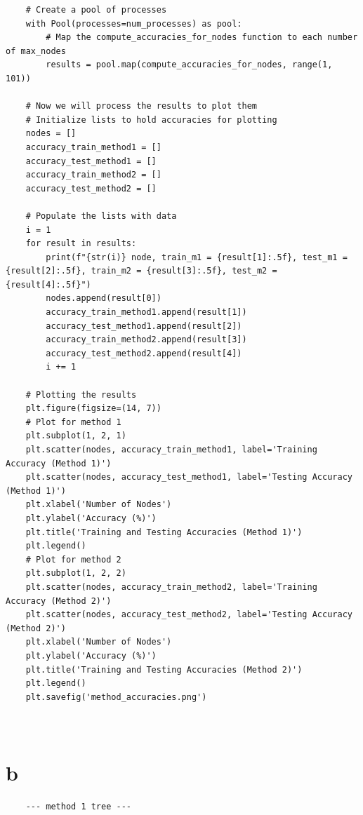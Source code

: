 \documentclass[10pt]{article}
\begin{document}
\begin{enumerate}
\begin{lstlisting}
    # Create a pool of processes
    with Pool(processes=num_processes) as pool:
        # Map the compute_accuracies_for_nodes function to each number of max_nodes
        results = pool.map(compute_accuracies_for_nodes, range(1, 101))

    # Now we will process the results to plot them
    # Initialize lists to hold accuracies for plotting
    nodes = []
    accuracy_train_method1 = []
    accuracy_test_method1 = []
    accuracy_train_method2 = []
    accuracy_test_method2 = []

    # Populate the lists with data
    i = 1
    for result in results:
        print(f"{str(i)} node, train_m1 = {result[1]:.5f}, test_m1 = {result[2]:.5f}, train_m2 = {result[3]:.5f}, test_m2 = {result[4]:.5f}")
        nodes.append(result[0])
        accuracy_train_method1.append(result[1])
        accuracy_test_method1.append(result[2])
        accuracy_train_method2.append(result[3])
        accuracy_test_method2.append(result[4])
        i += 1
    
    # Plotting the results
    plt.figure(figsize=(14, 7))
    # Plot for method 1
    plt.subplot(1, 2, 1)
    plt.scatter(nodes, accuracy_train_method1, label='Training Accuracy (Method 1)')
    plt.scatter(nodes, accuracy_test_method1, label='Testing Accuracy (Method 1)')
    plt.xlabel('Number of Nodes')
    plt.ylabel('Accuracy (%)')
    plt.title('Training and Testing Accuracies (Method 1)')
    plt.legend()
    # Plot for method 2
    plt.subplot(1, 2, 2)
    plt.scatter(nodes, accuracy_train_method2, label='Training Accuracy (Method 2)')
    plt.scatter(nodes, accuracy_test_method2, label='Testing Accuracy (Method 2)')
    plt.xlabel('Number of Nodes')
    plt.ylabel('Accuracy (%)')
    plt.title('Training and Testing Accuracies (Method 2)')
    plt.legend()
    plt.savefig('method_accuracies.png')

		
\end{lstlisting}

\newpage
\part{b} 

\begin{lstlisting}
	--- method 1 tree ---


\end{lstlisting}
\end{enumerate}
\end{document}
